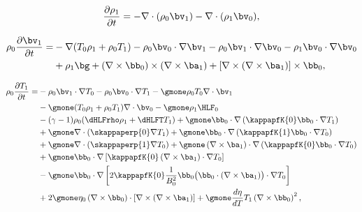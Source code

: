 {\customEquationFont

\begin{equation} \label{eq: linearised_continuity}
  \frac{\partial \rho_1}{\partial t} = -\nabla \cdot (\rho_0 \bv_1) - \nabla \cdot (\rho_1 \bv_0),
\end{equation}

\begin{equation} \label{eq: linearised_momentum}
  \begin{aligned}
    \rho_0\frac{\partial \bv_1}{\partial t} =&
      -\nabla(T_0\rho_1 + \rho_0 T_1)
      - \rho_0 \bv_0 \cdot \nabla\bv_1
      - \rho_0\bv_1 \cdot \nabla \bv_0
      - \rho_1 \bv_0 \cdot \nabla \bv_0 \\
      \quad&
      + \rho_1 \bg
      + (\nabla \times \bb_0) \times (\nabla \times \ba_1)
      + [\nabla \times (\nabla \times \ba_1)] \times \bb_0,
  \end{aligned}
\end{equation}

\begingroup
\allowdisplaybreaks
\begin{equation} \label{eq: linearised_energy}
  \begin{aligned}
    \rho_0\frac{\partial T_1}{\partial t} =&
      - \rho_0\bv_1 \cdot \nabla T_0
      - \rho_0 \bv_0 \cdot \nabla T_1
      - \gmone\rho_0 T_0 \nabla \cdot \bv_1 \\
      \quad&
      - \gmone(T_0 \rho_1 + \rho_0 T_1)\nabla \cdot \bv_0
      - \gmone\rho_1 \HLF_0 \\
      \quad&
      - (\gamma - 1)\rho_0(\dHLFrho \rho_1 + \dHLFT T_1)
      + \gmone \bb_0 \cdot \nabla\left(\kappapfK{0}\bb_0 \cdot \nabla T_1 \right) \\
      \quad&
      + \gmone \nabla \cdot \left(\skappaperp{0}\nabla T_1\right)
      + \gmone \bb_0 \cdot \nabla \left(\kappapfK{1} \bb_0 \cdot \nabla T_0\right) \\
      \quad&
      + \gmone \nabla \cdot \left(\skappaperp{1} \nabla T_0\right)
      + \gmone \left(\nabla \times \ba_1\right) \cdot \nabla \left(\kappapfK{0}\bb_0 \cdot \nabla T_0\right) \\
      \quad&
      + \gmone \bb_0 \cdot \nabla \left[\kappapfK{0}\left(\nabla \times \ba_1\right) \cdot \nabla T_0\right] \\
      \quad&
      - \gmone \bb_0 \cdot \nabla \left[
        2\kappapfK{0}\frac{1}{B_0^2}\bb_0\bigl(\bb_0 \cdot \left(\nabla \times \ba_1\right)\bigr) \cdot \nabla T_0
      \right] \\
      \quad&
      + 2 \gmone \eta_0 \left(\nabla \times \bb_0\right)\cdot \left[\nabla \times \left(\nabla \times \ba_1\right)\right]
      + \gmone \frac{d\eta}{dT}T_1\left(\nabla \times \bb_0\right)^2, \\
  \end{aligned}
\end{equation}
\endgroup

}
